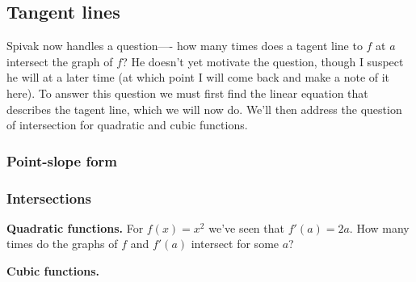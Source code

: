 \subsection{Tangent lines}
Spivak now handles a question---- how many times does a tagent line to
$f$ at $a$ intersect the graph of $f$? He doesn't yet motivate the
question, though I suspect he will at a later time (at which point I
will come back and make a note of it here). To answer this question we
must first find the linear equation that describes the tagent line,
which we will now do. We'll then address the question of intersection
for quadratic and cubic functions.

\subsubsection*{Point-slope form}

\subsubsection*{Intersections}

\textbf{Quadratic functions.} For $f(x)=x^2$ we've seen that
$f'(a)=2a$. How many times do the graphs of $f$ and $f'(a)$ intersect
for some $a$?

\vs

\textbf{Cubic functions.}

